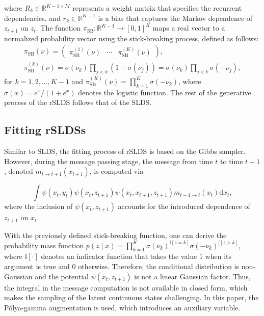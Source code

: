 where $R_{k} \in \mathbb{R}^{K-1 \times M}$ represents a weight matrix that specifies the recurrent dependencies, and $r_{k} \in \mathbb{R}^{K-1}$ is a bias that captures the Markov dependence of $z_{t+1}$ on $z_{t}$. The function $\pi_{\mathrm{SB}}: \mathbb{R}^{K-1} \rightarrow[0,1]^{K}$ maps a real vector to a normalized probability vector using the stick-breaking process, defined as follows:
$$
\begin{gathered}
\pi_{\mathrm{SB}}(\nu)=\left(\begin{array}{lll}
\pi_{\mathrm{SB}}^{(1)}(\nu) & \cdots & \pi_{\mathrm{SB}}^{(K)}(\nu)
\end{array}\right), \\
\pi_{\mathrm{SB}}^{(k)}(\nu)=\sigma\left(\nu_{k}\right) \prod_{j<k}\left(1-\sigma\left(\nu_{j}\right)\right)=\sigma\left(\nu_{k}\right) \prod_{j<k} \sigma\left(-\nu_{j}\right),
\end{gathered}
$$
for $k=1,2, \ldots, K-1$ and $\pi_{\mathrm{SB}}^{(K)}(\nu)=\prod_{k=1}^{K} \sigma\left(-\nu_{k}\right)$, where $\sigma(x)=e^{x} /\left(1+e^{x}\right)$ denotes the logistic function. The rest of the generative process of the rSLDS follows that of the SLDS. 

\subsection{Fitting rSLDSs} 
Similar to SLDS, the fitting process of rSLDS is based on the Gibbs sampler. However, during the message passing stage, the message from time $t$ to time $t+1$, denoted $m_{t \rightarrow t+1}\left(x_{t+1}\right)$, is computed via

$$
\int \psi\left(x_{t}, y_{t}\right) \psi\left(x_{t}, z_{t+1}\right) \psi\left(x_{t}, x_{t+1}, z_{t+1}\right) m_{t-1 \rightarrow t}\left(x_{t}\right) \mathrm{d} x_{t},
$$ 
where the inclusion of $\psi\left(x_{t}, z_{t+1}\right)$ accounts for the introduced dependence of $z_{t+1}$ on $x_t$.

With the previously defined stick-breaking function, one can derive the probability mass function $p(z \mid x)=\prod_{k=1}^{K} \sigma\left(\nu_{k}\right)^{\mathbb{I}[z=k]} \sigma\left(-\nu_{k}\right)^{\mathbb{[}[z>k]}
$, where $\mathbb{I}[\cdot]$ denotes an indicator function that takes the value $1$ when its argument is true and $0$ otherwise. Therefore, the conditional distribution is non-Gaussian and the potential $\psi\left(x_{t}, z_{t+1}\right)$ is not a linear Gaussian factor. Thus, the integral in the message computation is not available in closed form, which makes the sampling of the latent continuous states challenging. In this paper, the Pólya-gamma augmentation \cite{linderman_dependent_2015} is used, which introduces an auxiliary variable.

